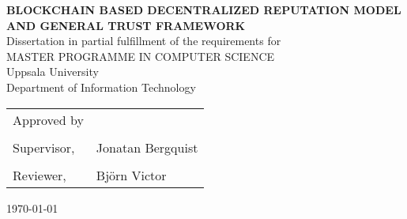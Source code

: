 
\thispagestyle{empty}

\vspace*{+5em}
\begin{center}
\textbf{BLOCKCHAIN BASED DECENTRALIZED REPUTATION MODEL AND GENERAL TRUST FRAMEWORK}\\
\vspace*{+4em}
Dissertation in partial fulfillment of the requirements for \\
\vspace{+2em}
MASTER PROGRAMME IN COMPUTER SCIENCE\\

\vspace*{+3em}
Uppsala University\\
Department of Information Technology\\
\vspace*{+2em}

\end{center}

\begin{tabular}{ l l }
 Approved by &   \\
  & \\
  Supervisor, & Jonatan Bergquist \\ 
  & \\
  Reviewer, & Björn Victor \\
\end{tabular}

\vspace*{+4em}

\begin{center}
\today
\end{center}
